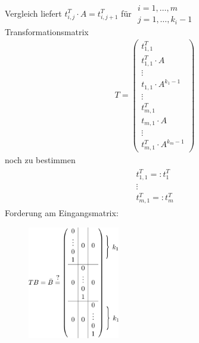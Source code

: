 \documentclass[ngerman]{tudscrreprt}
\begin{document}
Vergleich liefert $t_{i,j}^T \cdot A = t_{i,j+1}^T $ für $\substack{ i = 1,\dots, m\\ j = 1,\dots, k_i-1}$
\\ Transformationsmatrix \begin{align*}
T = \left(
\begin{array}{ c }
t_{1,1}^T \\ t_{1,1}^T\cdot A\\ \vdots\\ t_{1,1}\cdot A^{k_1 -1}\\ \hline \vdots\\ \hline t_{m,1}^T\\ t_{m,1}\cdot A\\ \vdots\\ t_{m,1}^T\cdot A^{k_m-1}
\end{array}
\right)
\end{align*} noch zu bestimmen \begin{align*} \begin{matrix} t_{1,1}^T =: t_1^T\\ \vdots\\ t_{m,1}^T =: t_m^T\end{matrix}\end{align*} 
Forderung am Eingangsmatrix: 
\begin{figure}[H]
\centering
\def\svgwidth{200pt} 
  \includegraphics[width=4cm]{TBmatrix.pdf}
\end{figure}
\end{document}
